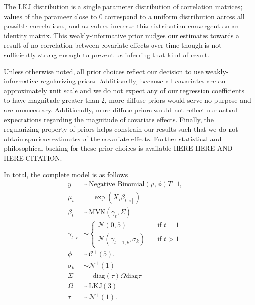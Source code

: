 \documentclass[12pt,letterpaper]{article}
\begin{document}
The LKJ distribution is a single parameter distribution of correlation matrices; values of the parameer close to 0 correspond to a uniform distribution across all possible correlations, and as values increase this distribution convergent on an identity matrix. This weakly-informative prior nudges our estimates towards a result of no correlation between covariate effects over time though is not sufficiently strong enough to prevent us inferring that kind of result.

Unless otherwise noted, all prior choices reflect our decision to use weakly-informative regularizing priors. Additionally, because all covariates are on approximately unit scale and we do not expect any of our regression coefficients to have magnitude greater than 2, more diffuse priors would serve no purpose and are unnecessary. Additionally, more diffuse priors would not reflect our actual expectations regarding the magnitude of covariate effects. Finally, the regularizing property of priors helps constrain our results such that we do not obtain spurious estimates of the covariate effects. Further statistical and philosophical backing for these prior choices is available HERE HERE AND HERE CITATION.

In total, the complete model is as follows
\begin{equation}
  \begin{aligned}
    y &\sim \text{Negative Binomial}(\mu, \phi) T[1, ] \\
    \mu_{i} &= \exp(X_{i} \beta_{t[i]}) \\
    \beta_{t} &\sim \text{MVN}(\gamma_{t}, \Sigma) \\
    \gamma_{t, k} &\sim 
      \begin{cases}
        \mathcal{N}(0, 5) & \quad \text{if } t = 1 \\
        \mathcal{N}(\gamma_{t - 1, k}, \sigma_{k}) & \quad \text{if } t > 1
      \end{cases} \\
    \phi &\sim \mathcal{C}^{+}(5). \\
    \sigma_{k} &\sim \mathcal{N}^{+}(1) \\ 
    \Sigma &= \text{diag}(\tau) \Omega \text{diag}{\tau} \\
    \Omega &\sim \text{LKJ}(3) \\
    \tau &\sim \mathcal{N}^{+}(1). \\
  \end{aligned}
\end{equation}
\end{document}
